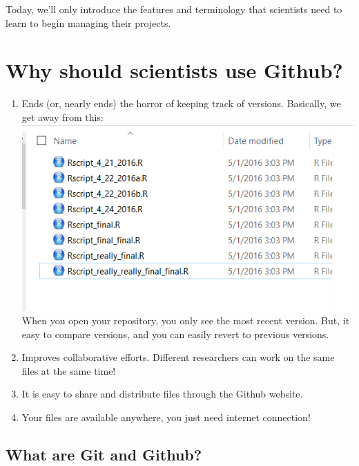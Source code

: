 \documentclass[]{book}
\providecommand{\tightlist}{%
  \setlength{\itemsep}{0pt}\setlength{\parskip}{0pt}}
\theoremstyle{definition}
\theoremstyle{definition}
\theoremstyle{definition}
\theoremstyle{remark}
\begin{document}
Today, we'll only introduce the features and terminology that scientists
need to learn to begin managing their projects.

\section{Why should scientists use
Github?}\label{why-should-scientists-use-github}

\begin{enumerate}
\def\labelenumi{\arabic{enumi}.}
\tightlist
\item
  Ends (or, nearly ends) the horror of keeping track of versions.
  Basically, we get away from this: \includegraphics{img/MessySaves.png}
  When you open your repository, you only see the most recent version.
  But, it easy to compare versions, and you can easily revert to
  previous versions. 
\item
  Improves collaborative efforts. Different researchers can work on the
  same files at the same time!
\item
  It is easy to share and distribute files through the Github website.
\item
  Your files are available anywhere, you just need internet connection!
\end{enumerate}

\subsection{What are Git and Github?}\label{what-are-git-and-github}
\end{document}
